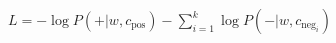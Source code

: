 \documentclass[preview]{standalone}
\begin{document}
\begin{align*}
L = -\log P(+|w,c_{\text{pos}}) - \sum_{i=1}^{k} \log P(-|w,c_{\text{neg}_i})
\end{align*}
\end{document}
